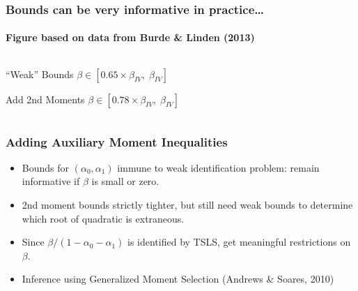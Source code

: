 \documentclass{beamer}
\begin{document}
\begin{frame}[c]
  \frametitle{Bounds can be very informative in practice\ldots}
  \framesubtitle{Figure based on data from Burde \& Linden (2013)}
\begin{columns}[c]
  \begin{column}{0.4\textwidth}
    \begin{block}{``Weak'' Bounds}
      $\beta \in [0.65 \times\beta_{IV},\; \beta_{IV}]$
    \end{block}
    \vspace{1em}
    \begin{alertblock}{Add 2nd Moments}
      $\beta \in [0.78 \times \beta_{IV},\;\beta_{IV}]$
    \end{alertblock}
  \end{column}
  \begin{column}{0.6\textwidth}
      \begin{figure}[h]
        \centering
      \end{figure}
  \end{column}
\end{columns}
 
\end{frame}
\begin{frame}
  \frametitle{Adding Auxiliary Moment Inequalities}

  \begin{itemize}
    \item Bounds for $(\alpha_0, \alpha_1)$ immune to weak identification problem: remain informative if $\beta$ is small or zero.
    \item 2nd moment bounds strictly tighter, but still need weak bounds to determine which root of  quadratic is extraneous.
    \item Since $\beta /(1 - \alpha_0 - \alpha_1)$ is identified by TSLS, get meaningful restrictions on $\beta$.
    \item Inference using Generalized Moment Selection (Andrews \& Soares, 2010)
  \end{itemize}

  
\end{frame}
\end{document}
